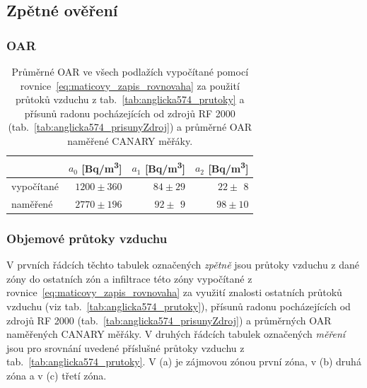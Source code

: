 \subsection{Zpětné ověření}
\subsubsection{OAR}
\begin{table}[H]
    \centering
    \caption{Průměrné OAR ve všech podlažích vypočítané pomocí rovnice~\eqref{eq:maticovy_zapis_rovnovaha} za použití průtoků vzduchu z tab.~\ref{tab:anglicka574_prutoky} a přísunů radonu pocházejících od zdrojů RF 2000 (tab.~\ref{tab:anglicka574_prisunyZdroj}) a průměrné OAR naměřené CANARY měřáky.}
    \label{tab:anglicka574_OAR_zpetne}
    \begin{tabular}{lrrr}
        \toprule
        & $a_0$ [\si{Bq/m^3}] &  $a_1$ [\si{Bq/m^3}]& $a_2$ [\si{Bq/m^3}]\\
        \midrule
       vypočítané & $1200\pm360$    & $84\pm29$ & $22\pm\ \,8$\\
       naměřené & $2770\pm196$ & $92\pm\ \,9$& $98\pm10$\\
        \bottomrule
    \end{tabular}
\end{table}
\subsubsection{Objemové průtoky vzduchu}

\begin{table}[H]
    \centering
    \caption{V prvních řádcích těchto tabulek označených \emph{zpětně} jsou průtoky vzduchu z dané zóny do ostatních zón a infiltrace této zóny vypočítané z rovnice~\eqref{eq:maticovy_zapis_rovnovaha} za využití znalosti ostatních průtoků vzduchu (viz tab.~\ref{tab:anglicka574_prutoky}), přísunů radonu pocházejících od zdrojů RF 2000 (tab.~\ref{tab:anglicka574_prisunyZdroj}) a průměrných OAR naměřených CANARY měřáky. V druhých řádcích tabulek označených \emph{měření} jsou pro srovnání uvedené příslušné průtoky vzduchu z tab.~\ref{tab:anglicka574_prutoky}. V (a) je zájmovou zónou první zóna, v (b) druhá zóna a v (c) třetí zóna.}
    \label{tab:anglicka574_prutoky_zpetne}
    \begin{subtable}{\textwidth}
        \centering
        \caption{}
        
    \end{subtable}
    \vspace{1em}

    \begin{subtable}{\textwidth}
        \centering
        \caption{}
        
    \end{subtable}
    \vspace{1em}

    \begin{subtable}{\textwidth}
        \centering
        \caption{}
        
    \end{subtable}
\end{table}

